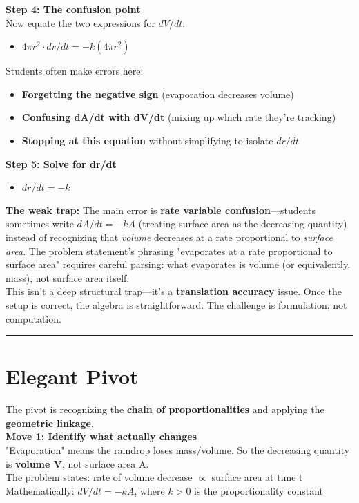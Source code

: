 \documentclass{article}
\begin{document}
\noindent \textbf{Step 4: The confusion point} \\
Now equate the two expressions for $dV/dt$:
\begin{itemize}
    \item $4\pi r^2 \cdot dr/dt = -k(4\pi r^2)$
\end{itemize}
Students often make errors here:
\begin{itemize}
    \item \textbf{Forgetting the negative sign} (evaporation decreases volume)
    \item \textbf{Confusing dA/dt with dV/dt} (mixing up which rate they're tracking)
    \item \textbf{Stopping at this equation} without simplifying to isolate $dr/dt$
\end{itemize}

\noindent \textbf{Step 5: Solve for dr/dt}
\begin{itemize}
    \item $dr/dt = -k$
\end{itemize}

\noindent \textbf{The weak trap:} The main error is \textbf{rate variable confusion}—students sometimes write $dA/dt = -kA$ (treating surface area as the decreasing quantity) instead of recognizing that \textit{volume} decreases at a rate proportional to \textit{surface area}. The problem statement's phrasing "evaporates at a rate proportional to surface area" requires careful parsing: what evaporates is volume (or equivalently, mass), not surface area itself. \\

\noindent This isn't a deep structural trap—it's a \textbf{translation accuracy} issue. Once the setup is correct, the algebra is straightforward. The challenge is formulation, not computation.

\noindent \rule{\textwidth}{0.4pt}

\section*{Elegant Pivot}

The pivot is recognizing the \textbf{chain of proportionalities} and applying the \textbf{geometric linkage}. \\

\noindent \textbf{Move 1: Identify what actually changes} \\
"Evaporation" means the raindrop loses mass/volume. So the decreasing quantity is \textbf{volume V}, not surface area A. \\
The problem states: rate of volume decrease $\propto$ surface area at time t \\
Mathematically: $dV/dt = -kA$, where $k > 0$ is the proportionality constant \\
\end{document}
